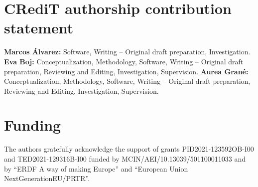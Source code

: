 \section*{CRediT authorship contribution statement}

{\bf Marcos Álvarez:} Software, Writing -- Original draft preparation, Investigation.  
{\bf Eva Boj:} Conceptualization, Methodology, Software, Writing -- Original draft preparation, Reviewing and Editing, Investigation, Supervision.  
{\bf Aurea Grané:} Conceptualization, Methodology, Software, Writing -- Original draft preparation, Reviewing and Editing, Investigation, Supervision. 

\section*{Funding}

The authors gratefully acknowledge the support of grants PID2021-123592OB-I00 and TED2021-129316B-I00 funded by MCIN/AEI/10.13039/501100011033 and by ``ERDF A way of making Europe'' and ``European Union NextGenerationEU/PRTR''.



\address{Eva Boj\\
  Department of Economic, Financial and Actuarial Mathematics\\
	Universitat de Barcelona\\
  Avinguda Diagonal 690, 08034 Barcelona\\
  Spain\\
	ORCID: 0000-0002-9487-0693\\
  }

\address{Aurea Grané\\
  Statistics Department\\
  Universidad Carlos III de Madrid\\
  Calle Madrid 126, 28903 Getafe\\
  Spain\\
	ORCID: 0000-0003-0980-6409\\
  }

\address{Marcos \'Alvarez\\
	Statistics Department\\
  Universidad Carlos III de Madrid\\
  Calle Madrid 126, 28903 Getafe\\
  Spain\\
	ORCID: 0009-0006-6192-0152\\
  }

